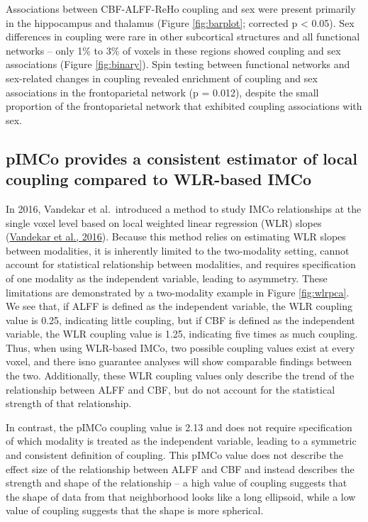 \documentclass[
  12pt,
]{article}
\begin{document}
Associations between CBF-ALFF-ReHo coupling and sex were present primarily in the hippocampus and thalamus (Figure \ref{fig:barplot}; corrected p \textless{} 0.05). Sex differences in coupling were rare in other subcortical structures and all functional networks -- only 1\% to 3\% of voxels in these regions showed coupling and sex associations (Figure \ref{fig:binary}). Spin testing between functional networks and sex-related changes in coupling revealed enrichment of coupling and sex associations in the frontoparietal network (p = 0.012), despite the small proportion of the frontoparietal network that exhibited coupling associations with sex.

\hypertarget{pimco-provides-a-consistent-estimator-of-local-coupling-compared-to-wlr-based-imco}{%
\subsection{pIMCo provides a consistent estimator of local coupling compared to WLR-based IMCo}\label{pimco-provides-a-consistent-estimator-of-local-coupling-compared-to-wlr-based-imco}}

In 2016, Vandekar et al.~introduced a method to study IMCo relationships at the single voxel level based on local weighted linear regression (WLR) slopes (\protect\hyperlink{ref-vandekarSubjectlevelMeasurementLocal2016}{Vandekar et al., 2016}). Because this method relies on estimating WLR slopes between modalities, it is inherently limited to the two-modality setting, cannot account for statistical relationship between modalities, and requires specification of one modality as the independent variable, leading to asymmetry. These limitations are demonstrated by a two-modality example in Figure \ref{fig:wlrpca}. We see that, if ALFF is defined as the independent variable, the WLR coupling value is 0.25, indicating little coupling, but if CBF is defined as the independent variable, the WLR coupling value is 1.25, indicating five times as much coupling. Thus, when using WLR-based IMCo, two possible coupling values exist at every voxel, and there isno guarantee analyses will show comparable findings between the two. Additionally, these WLR coupling values only describe the trend of the relationship between ALFF and CBF, but do not account for the statistical strength of that relationship.

In contrast, the pIMCo coupling value is 2.13 and does not require specification of which modality is treated as the independent variable, leading to a symmetric and consistent definition of coupling. This pIMCo value does not describe the effect size of the relationship between ALFF and CBF and instead describes the strength and shape of the relationship -- a high value of coupling suggests that the shape of data from that neighborhood looks like a long ellipsoid, while a low value of coupling suggests that the shape is more spherical.
\end{document}
